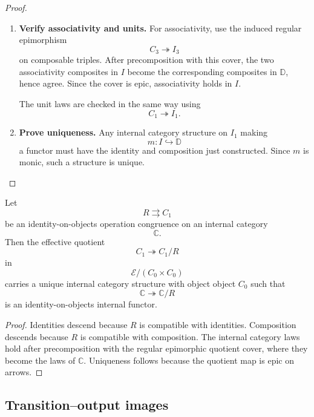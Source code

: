 \begin{proof}
\begin{enumerate}
        \item \textbf{Verify associativity and units.}
        For associativity, use the induced regular epimorphism
        \[
            C_3\twoheadrightarrow I_3
        \]
        on composable triples. After precomposition with this cover, the two
        associativity composites in \(I\) become the corresponding composites
        in \(\mathbb D\), hence agree. Since the cover is epic, associativity
        holds in \(I\).

        The unit laws are checked in the same way using
        \[
            C_1\twoheadrightarrow I_1.
        \]

        \item \textbf{Prove uniqueness.}
        Any internal category structure on \(I_1\) making
        \[
            m:I\hookrightarrow\mathbb D
        \]
        a functor must have the identity and composition just constructed.
        Since \(m\) is monic, such a structure is unique.
    \end{enumerate}
\end{proof}

\begin{lemma}
\label{lem:to-identity-on-objects-congruence-quotient}
    Let
    \[
        R\rightrightarrows C_1
    \]
    be an identity-on-objects operation congruence on an internal category
    \[
        \mathbb C.
    \]
    Then the effective quotient
    \[
        C_1\twoheadrightarrow C_1/R
    \]
    in
    \[
        \mathcal E/(C_0\times C_0)
    \]
    carries a unique internal category structure with object object \(C_0\)
    such that
    \[
        \mathbb C\twoheadrightarrow \mathbb C/R
    \]
    is an identity-on-objects internal functor.
\end{lemma}

\begin{proof}
    Identities descend because \(R\) is compatible with identities.
    Composition descends because \(R\) is compatible with composition. The
    internal category laws hold after precomposition with the regular
    epimorphic quotient cover, where they become the laws of \(\mathbb C\).
    Uniqueness follows because the quotient map is epic on arrows.
\end{proof}

\subsection{Transition--output images}
\label{subsec:to-operation-images}

